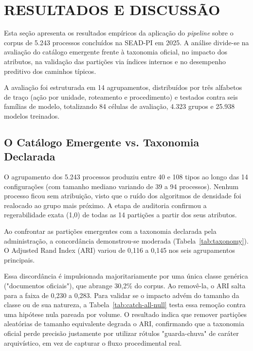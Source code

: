 \section{RESULTADOS E DISCUSSÃO}\label{sec:res}

Esta seção apresenta os resultados empíricos da aplicação do \emph{pipeline} sobre o corpus de 5.243 processos concluídos na SEAD-PI em 2025. A análise divide-se na avaliação do catálogo emergente frente à taxonomia oficial, no impacto dos atributos, na validação das partições via índices internos e no desempenho preditivo dos caminhos típicos. 

A avaliação foi estruturada em 14 agrupamentos, distribuídos por três alfabetos de traço (ação por unidade, roteamento e procedimento) e testados contra seis famílias de modelo, totalizando 84 células de avaliação, 4.323 grupos e 25.938 modelos treinados.

\subsection{O Catálogo Emergente vs. Taxonomia Declarada}\label{sec:res-catalogo}

O agrupamento dos 5.243 processos produziu entre 40 e 108 tipos ao longo das 14 configurações (com tamanho mediano variando de 39 a 94 processos). Nenhum processo ficou sem atribuição, visto que o ruído dos algoritmos de densidade foi realocado ao grupo mais próximo. A etapa de auditoria confirmou a regerabilidade exata (1,0) de todas as 14 partições a partir dos seus atributos.

Ao confrontar as partições emergentes com a taxonomia declarada pela administração, a concordância demonstrou-se moderada (Tabela~\ref{tab:taxonomy}). O Adjusted Rand Index (ARI) variou de 0,116 a 0,145 nos seis agrupamentos principais. 



Essa discordância é impulsionada majoritariamente por uma única classe genérica ("documentos oficiais"), que abrange 30,2\% do corpus. Ao removê-la, o ARI salta para a faixa de 0,230 a 0,283. Para validar se o impacto advém do tamanho da classe ou de sua natureza, a Tabela~\ref{tab:catch-all-null} testa essa remoção contra uma hipótese nula pareada por volume. O resultado indica que remover partições aleatórias de tamanho equivalente degrada o ARI, confirmando que a taxonomia oficial perde precisão justamente por utilizar rótulos "guarda-chuva" de caráter arquivístico, em vez de capturar o fluxo procedimental real.

